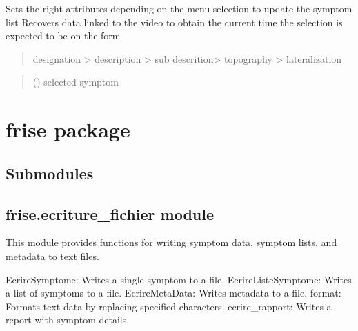 \documentclass[letterpaper,10pt,english]{sphinxmanual}
\begin{document}
\begin{fulllineitems}
\begin{fulllineitems}
\sphinxAtStartPar
Sets the right attributes depending on the menu selection to update the symptom list
Recovers data linked to the video to obtain the current time
the selection is expected to be on the form
\begin{quote}

\sphinxAtStartPar
designation \textgreater{} description \textgreater{} sub descrition\textgreater{} topography \textgreater{} lateralization
\end{quote}
\begin{quote}\begin{description}
\sphinxAtStartPar
{} () \textendash{} selected symptom

\end{description}\end{quote}

\end{fulllineitems}


\end{fulllineitems}


\sphinxstepscope


\chapter{frise package}
\label{\detokenize{frise:frise-package}}\label{\detokenize{frise::doc}}

\section{Submodules}
\label{\detokenize{frise:submodules}}

\section{frise.ecriture\_fichier module}
\label{\detokenize{frise:module-frise.ecriture_fichier}}\label{\detokenize{frise:frise-ecriture-fichier-module}}
\sphinxAtStartPar
This module provides functions for writing symptom data, symptom lists, and metadata to text files.
\begin{description}
\sphinxAtStartPar
EcrireSymptome: Writes a single symptom to a file.
EcrireListeSymptome: Writes a list of symptoms to a file.
EcrireMetaData: Writes metadata to a file.
format: Formats text data by replacing specified characters.
ecrire\_rapport: Writes a report with symptom details.

\end{description}
\end{document}
